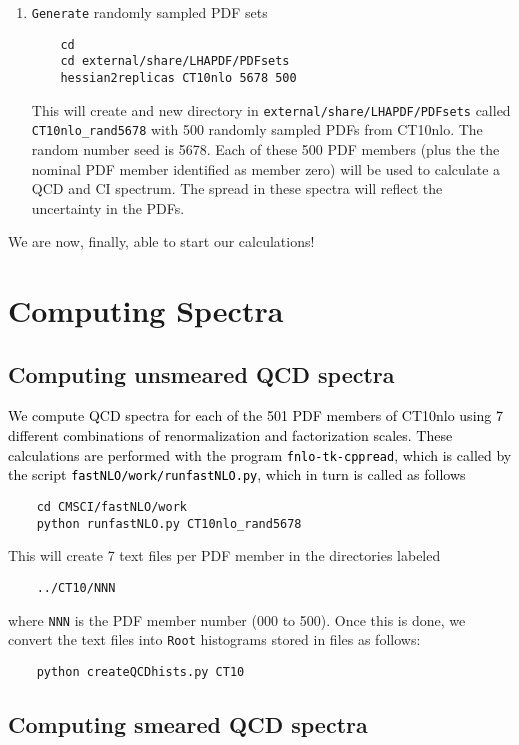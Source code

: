 \documentclass[aps,prd,preprint,nofootinbib]{revtex4}
\begin{document}
\begin{enumerate}
\item {\tt Generate} randomly sampled PDF sets
	\begin{verbatim}
	cd
	cd external/share/LHAPDF/PDFsets
	hessian2replicas CT10nlo 5678 500
	\end{verbatim}
This will create and new directory in {\tt external/share/LHAPDF/PDFsets} called 
{\tt CT10nlo\_rand5678} with 500 randomly sampled PDFs from {CT10nlo}. The random
number seed is 5678. Each of these 500 PDF members (plus the the nominal PDF member identified as member zero) will be used to calculate a QCD and CI
spectrum. The spread in these spectra will reflect the uncertainty in the PDFs.

\end{enumerate}

We are now, finally, able to start our calculations! 

\section{Computing Spectra}

\subsection{Computing unsmeared QCD spectra}

\textcolor{black}{
We compute QCD spectra for each of the 501 PDF members of CT10nlo using 7 different 
combinations of renormalization and factorization scales. These calculations are performed with
the program {\tt fnlo-tk-cppread}, which is called by the script {\tt fastNLO/work/runfastNLO.py},
which in turn is called as follows}
	\begin{verbatim}
	cd CMSCI/fastNLO/work
	python runfastNLO.py CT10nlo_rand5678
	\end{verbatim}

This will create 7 text files per PDF member in the directories labeled
	\begin{verbatim}
	../CT10/NNN
	\end{verbatim}
where {\tt NNN} is the PDF member number (000 to 500).  Once this is done, we convert the text files into {\tt Root} histograms stored in files as follows:
	\begin{verbatim}
	python createQCDhists.py CT10
	\end{verbatim}

\subsection{Computing smeared QCD spectra}
\end{document}
